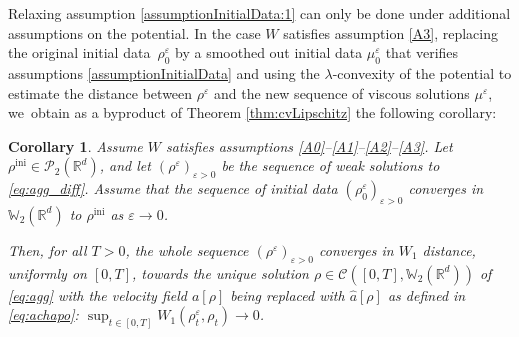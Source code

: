 \documentclass[JEP,XML,SOM,Unicode, NoFloatCountersInSection,published]{cedram}
\newcommand{\ini}{\mathrm{ini}}
\def\RR{\mathbb{R}}
\def\WW{\mathbb{W}}
\def\eps{\varepsilon}
\def\calC{{\mathcal C}}
\def\calP{{\mathcal P}}
\def\achapo{\widehat{a}}
\theoremstyle{plain}
\newtheorem{corollary}[theorem]{Corollary}
\theoremstyle{definition}
\begin{document}
Relaxing assumption \eqref{assumptionInitialData:1} can only be done under additional assumptions on the potential. In the case $W$ satisfies assumption \eqref{A3}, replacing the original initial data~$\rho^\eps_0$ by a smoothed out initial data $\mu_0^\eps$ that verifies assumptions \eqref{assumptionInitialData} and using the $\lambda$\nobreakdash-convexity of the potential to estimate the distance between $\rho^\eps$ and the new sequence of viscous solutions $\mu^\eps$, we~obtain as a byproduct of Theorem \ref{thm:cvLipschitz} the following corollary:
\begin{corollary}\label{coroll:cvLambdaCvx}
Assume $W$ satisfies assumptions \eqref{A0}--\eqref{A1}--\eqref{A2}--\eqref{A3}. Let $\rho^{\ini} \in \calP_2(\RR^d)$, and let $(\rho^\eps)_{\eps > 0}$ be the sequence of weak solutions to \eqref{eq:agg_diff}. Assume that the sequence of initial data $(\rho_0^\eps)_{\eps>0}$ converges in $\WW_2(\RR^d)$ to $\rho^{\ini}$ as $\eps \to 0$.

Then, for all $T>0$, the whole sequence $(\rho^\eps)_{\eps > 0}$ converges in $W_1$ distance, uniformly on $[0,T]$, towards the unique solution $\rho \in \calC([0,T], \WW _2(\RR^d))$ of \eqref{eq:agg} with the velocity field $a[\rho]$ being replaced with $\achapo[\rho]$ as defined in \eqref{eq:achapo}: $\sup_{t\in[0, T]} W_1(\rho_t^\eps,\rho_t) \to 0$.
\end{corollary}
\end{document}

